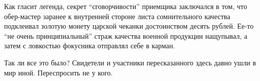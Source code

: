 Как гласит легенда, секрет \enquote{сговорчивости} приемщика заключался в том, что
обер-мастер заранее к внутренней стороне листа сомнительного качества
подклеивал золотую монету царской чеканки достоинством десять рублей. Ее-то \enquote{не
очень принципиальный} страж качества военной продукции нащупывал, а затем с
ловкостью фокусника отправлял себе в карман.

Так ли все это было? Свидетели и участники пересказанного здесь давно ушли в
мир иной. Переспросить не у кого.
